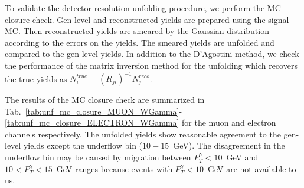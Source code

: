 To validate the detector resolution unfolding procedure, we perform the MC closure check. Gen-level and reconstructed yields are prepared using the signal MC. Then reconstructed yields are smeared by the Gaussian distribution according to the errors on the yields. The smeared yields are unfolded and compared to the gen-level yields. In addition to the D'Agostini method, we check the performance of the matrix inversion method for the unfolding which recovers the true yields as $N^{true}_i = (R_{ji})^{-1} N^{reco}_j$. 

The results of the MC closure check are summarized in Tab.~\ref{tab:unf_mc_closure_MUON_WGamma}-\ref{tab:unf_mc_closure_ELECTRON_WGamma} for the muon and electron channels respectively. The unfolded yields show reasonable agreement to the gen-level yields except the underflow bin ($10-15$~GeV). The disagreement in the underflow bin may be caused by migration between $P_T^{\gamma}<10$~GeV and  $10<P_T^{\gamma}<15$~GeV ranges because events with $P_T^{\gamma}<10$~GeV are not available to us.  




